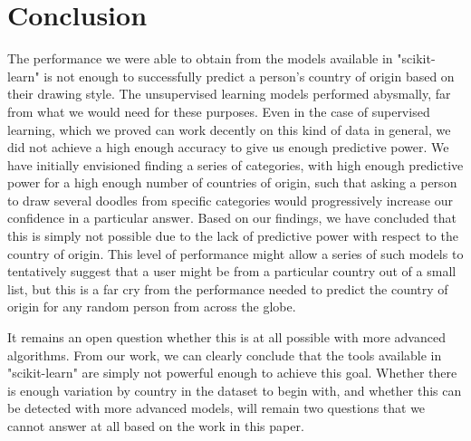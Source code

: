 \documentclass[a4paper, twocolumn]{article}
\begin{document}
\section{Conclusion\label{sec:Conclusion}}
The performance we were able to obtain from the models available in "scikit-learn" is not enough to successfully predict a person's country of origin based on their drawing style. The unsupervised learning models performed abysmally, far from what we would need for these purposes. Even in the case of supervised learning, which we proved can work decently on this kind of data in general, we did not achieve a high enough accuracy to give us enough predictive power. We have initially envisioned finding a series of categories, with high enough predictive power for a high enough number of countries of origin, such that asking a person to draw several doodles from specific categories would progressively increase our confidence in a particular answer. Based on our findings, we have concluded that this is simply not possible due to the lack of predictive power with respect to the country of origin. This level of performance might allow a series of such models to tentatively suggest that a user might be from a particular country out of a small list, but this is a far cry from the performance needed to predict the country of origin for any random person from across the globe.

It remains an open question whether this is at all possible with more advanced algorithms. From our work, we can clearly conclude that the tools available in "scikit-learn" are simply not powerful enough to achieve this goal. Whether there is enough variation by country in the dataset to begin with, and whether this can be detected with more advanced models, will remain two questions that we cannot answer at all based on the work in this paper.

\printbibliography
\end{document}
